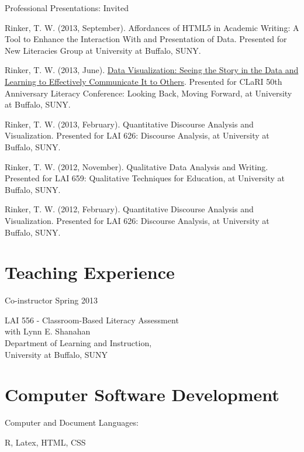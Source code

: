\halfblankline

Professional Presentations: Invited
\begin{innerlist}
    \item Rinker, T. W. (2013, September). Affordances of HTML5 in Academic Writing: A Tool to Enhance the Interaction With and Presentation of Data.  Presented for New Literacies Group at University at Buffalo, SUNY.
    \item Rinker, T. W. (2013, June). \href{http://www.youtube.com/watch?v=IHHPO4VhucY}{Data Visualization: Seeing the Story in the Data and Learning to Effectively Communicate It to Others}.  Presented for CLaRI 50th Anniversary Literacy Conference: Looking Back, Moving Forward, at University at Buffalo, SUNY.
	\item Rinker, T. W. (2013, February). Quantitative Discourse Analysis and Visualization. Presented for LAI 626: Discourse Analysis, at University at Buffalo, SUNY.
	\item Rinker, T. W. (2012, November). Qualitative Data Analysis and Writing. Presented for LAI 659: Qualitative Techniques for Education, at University at Buffalo, SUNY.
	\item Rinker, T. W. (2012, February). Quantitative Discourse Analysis and Visualization. Presented for LAI 626: Discourse Analysis, at University at Buffalo, SUNY.
\end{innerlist}

\section{Teaching Experience}

Co-instructor \hfill {Spring 2013}
\begin{innerlist}
\item[] LAI 556 - Classroom-Based Literacy Assessment\\
        with Lynn E. Shanahan\\
        Department of Learning and Instruction,\\
        University at Buffalo, SUNY
\end{innerlist}

\section{Computer Software Development}
Computer and Document Languages:
%
\begin{innerlist}
    \item R, Latex, HTML, CSS 
\end{innerlist}

